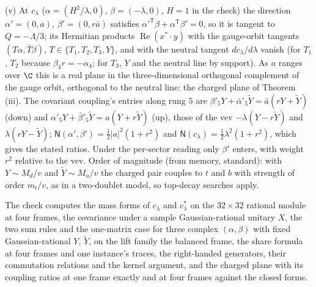 (v) At $c_{\lambda}$ ($\alpha = (H^{2}/\lambda, 0)$, $\beta = (-\lambda, 0)$, $H = 1$ in the check) the direction $\alpha' = (0, a)$, $\beta' = (0, r\bar{a})$ satisfies $\alpha'^{\mathsf T}\beta + \alpha^{\mathsf T}\beta' = 0$, so it is tangent to $Q = -\Lambda/3$; its Hermitian products $\operatorname{Re}(x^{*}\cdot y)$ with the gauge-orbit tangents $(T\alpha, \bar{T}\beta)$, $T \in \{T_{1}, T_{2}, T_{3}, Y\}$, and with the neutral tangent $dc_{\lambda}/d\lambda$ vanish (for $T_{1}$, $T_{2}$ because $\beta_{4}r = -\alpha_{4}$; for $T_{3}$, $Y$ and the neutral line by support). As $a$ ranges over $\C$ this is a real plane in the three-dimensional orthogonal complement of the gauge orbit, orthogonal to the neutral line: the charged plane of Theorem (iii). The covariant coupling's entries along rung $5$ are $\beta'_{5}Y + \bar{\alpha}'_{5}\tilde{Y} = \bar{a}(rY + \tilde{Y})$ (down) and $\alpha'_{5}Y + \bar{\beta}'_{5}\tilde{Y} = a(Y + r\tilde{Y})$ (up), those of the vev $-\lambda(Y - r\tilde{Y})$ and $\lambda(rY - \tilde{Y})$; $\mathsf{N}(\alpha', \beta') = \tfrac12|a|^{2}(1 + r^{2})$ and $\mathsf{N}(c_{\lambda}) = \tfrac12\lambda^{2}(1 + r^{2})$, which gives the stated ratios. Under the per-sector reading only $\beta'$ enters, with weight $r^{2}$ relative to the vev. Order of magnitude (from memory, standard): with $Y \sim M_{d}/v$ and $\tilde{Y} \sim M_{u}/v$ the charged pair couples to $t$ and $b$ with strength of order $m_{t}/v$, as in a two-doublet model, so top-decay searches apply.

The check computes the mass forms of $c_{\lambda}$ and $c_{\lambda}^{*}$ on the $32 \times 32$ rational module at four frames, the covariance under a sample Gaussian-rational unitary $X$, the two sum rules and the one-matrix case for three complex $(\alpha, \beta)$ with fixed Gaussian-rational $Y$, $\tilde{Y}$, on the lift family the balanced frame, the share formula at four frames and one instance's traces, the right-handed generators, their commutation relations and the kernel argument, and the charged plane with its coupling ratios at one frame exactly and at four frames against the closed forms.
